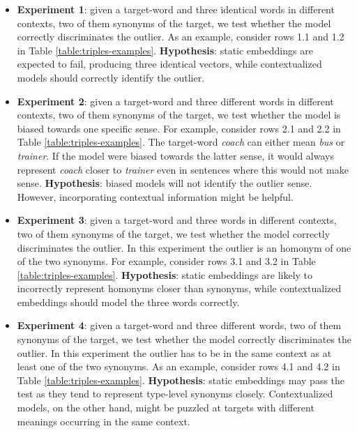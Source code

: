 \begin{itemize}
    \item \textbf{Experiment 1}: given a target-word and three identical words in different contexts, two of them synonyms of the target, we test whether the model correctly discriminates the outlier. As an example, consider rows 1.1 and 1.2 in Table \ref{table:triples-examples}. \textbf{Hypothesis}: static embeddings are expected to fail, producing three identical vectors, while contextualized models should correctly identify the outlier.

    \item \textbf{Experiment 2}: given a target-word and three different words in different contexts, two of them synonyms of the target, we test whether the model is biased towards one specific sense. For example, consider rows 2.1 and 2.2 in Table \ref{table:triples-examples}. The target-word \textit{coach} can either mean \textit{bus} or \textit{trainer}. If the model were biased towards the latter sense, it would always represent \textit{coach} closer to \textit{trainer} even in sentences where this would not make sense. \textbf{Hypothesis}: biased models will not identify the outlier sense. However, incorporating contextual information might be helpful.

    \item \textbf{Experiment 3}: given a target-word and three words in different contexts, two of them synonyms of the target, we test whether the model correctly discriminates the outlier. In this experiment the outlier is an homonym of one of the two synonyms. For example, consider rows 3.1 and 3.2 in Table \ref{table:triples-examples}. \textbf{Hypothesis}: static embeddings are likely to incorrectly represent homonyms closer than synonyms, while contextualized embeddings should model the three words correctly.

    \item \textbf{Experiment 4}: given a target-word and three different words, two of them synonyms of the target, we test whether the model correctly discriminates the outlier. In this experiment the outlier has to be in the same context as at least one of the two synonyms. As an example, consider rows 4.1 and 4.2 in Table \ref{table:triples-examples}. \textbf{Hypothesis}: static embeddings may pass the test as they tend to represent type-level synonyms closely. Contextualized models, on the other hand, might be puzzled at targets with different meanings occurring in the same context.
\end{itemize}


